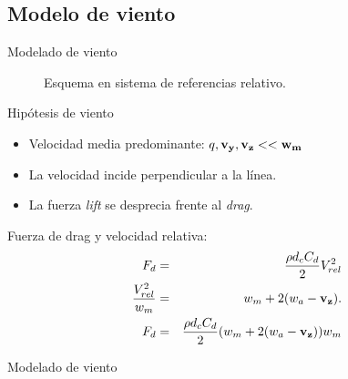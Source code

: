 \documentclass[
  aspectratio=169,
]{beamer}
\begin{document}
\begin{small}
\subsection[Modelado de viento]{Modelo de viento}
\begin{frame}{Modelado de viento}
	\begin{minipage}[t]{0.48\linewidth}
		\begin{figure}[htbp]
			\centering
			\def\svgwidth{60mm}
			
			\caption{Esquema en sistema de referencias relativo.}
		\end{figure}
	\end{minipage}\hfill
	\begin{minipage}[t]{0.48\linewidth}
		\vspace{-1.3cm}
		\begin{block}{Hipótesis de viento}
			\begin{itemize}
				\item Velocidad media predominante: $q,\bf{v_{y}},\bf{v_{z}}<<w_m$
				\item La velocidad incide perpendicular a la línea. 
				\item La fuerza \emph{lift} se desprecia frente al \emph{drag}.
			\end{itemize}
		\end{block}
		\pause
		\begin{block}{Fuerza de drag y velocidad relativa:}
			\begin{eqnarray}
					F_d &=& \frac{\rho d_c C_d}{2} V_{rel}^2\\
					\frac{V_{rel}^2}{w_m}&=&w_m + 2 (w_a-\bf{v}_{z}).\\
					F_d &=& \frac{\rho d_c C_d}{2} (w_m + 2 (w_a-\bf{v_{z}}))\text{$w_m$}
				\end{eqnarray}
		\end{block}
	\end{minipage}
\end{frame}
\begin{frame}{Modelado de viento}

\end{frame}
\end{small}
\end{document}
